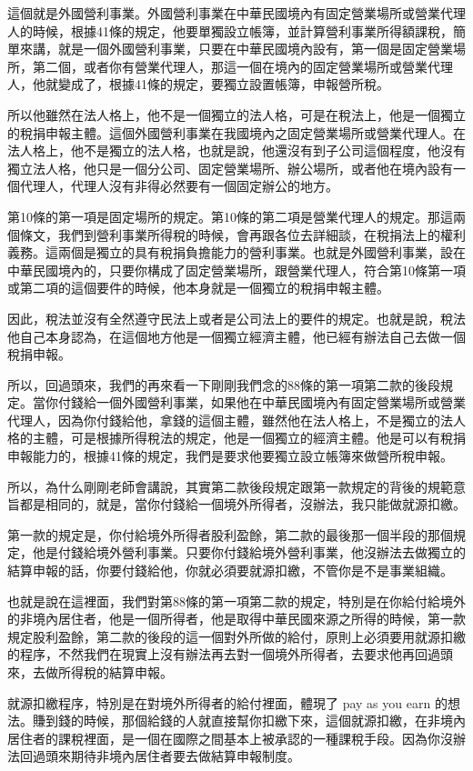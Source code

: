 \documentclass[oneside,sub3section]{ctexbook}
\begin{document}
這個就是外國營利事業。外國營利事業在中華民國境內有固定營業場所或營業代理人的時候，根據41條的規定，他要單獨設立帳簿，並計算營利事業所得額課稅，簡單來講，就是一個外國營利事業，只要在中華民國境內設有，第一個是固定營業場所，第二個，或者你有營業代理人，那這一個在境內的固定營業場所或營業代理人，他就變成了，根據41條的規定，要獨立設置帳簿，申報營所稅。

所以他雖然在法人格上，他不是一個獨立的法人格，可是在稅法上，他是一個獨立的稅捐申報主體。這個外國營利事業在我國境內之固定營業場所或營業代理人。在法人格上，他不是獨立的法人格，也就是說，他還沒有到子公司這個程度，他沒有獨立法人格，他只是一個分公司、固定營業場所、辦公場所，或者他在境內設有一個代理人，代理人沒有非得必然要有一個固定辦公的地方。

第10條的第一項是固定場所的規定。第10條的第二項是營業代理人的規定。那這兩個條文，我們到營利事業所得稅的時候，會再跟各位去詳細談，在稅捐法上的權利義務。這兩個是獨立的具有稅捐負擔能力的營利事業。也就是外國營利事業，設在中華民國境內的，只要你構成了固定營業場所，跟營業代理人，符合第10條第一項或第二項的這個要件的時候，他本身就是一個獨立的稅捐申報主體。

因此，稅法並沒有全然遵守民法上或者是公司法上的要件的規定。也就是說，稅法他自己本身認為，在這個地方他是一個獨立經濟主體，他已經有辦法自己去做一個稅捐申報。

所以，回過頭來，我們的再來看一下剛剛我們念的88條的第一項第二款的後段規定。當你付錢給一個外國營利事業，如果他在中華民國境內有固定營業場所或營業代理人，因為你付錢給他，拿錢的這個主體，雖然他在法人格上，不是獨立的法人格的主體，可是根據所得稅法的規定，他是一個獨立的經濟主體。他是可以有稅捐申報能力的，根據41條的規定，我們是要求他要獨立設立帳簿來做營所稅申報。

所以，為什么剛剛老師會講說，其實第二款後段規定跟第一款規定的背後的規範意旨都是相同的，就是，當你付錢給一個境外所得者，沒辦法，我只能做就源扣繳。

第一款的規定是，你付給境外所得者股利盈餘，第二款的最後那一個半段的那個規定，他是付錢給境外營利事業。只要你付錢給境外營利事業，他沒辦法去做獨立的結算申報的話，你要付錢給他，你就必須要就源扣繳，不管你是不是事業組織。

也就是說在這裡面，我們對第88條的第一項第二款的規定，特別是在你給付給境外的非境內居住者，他是一個所得者，他是取得中華民國來源之所得的時候，第一款規定股利盈餘，第二款的後段的這一個對外所做的給付，原則上必須要用就源扣繳的程序，不然我們在現實上沒有辦法再去對一個境外所得者，去要求他再回過頭來，去做所得稅的結算申報。

就源扣繳程序，特別是在對境外所得者的給付裡面，體現了 pay as you earn 的想法。賺到錢的時候，那個給錢的人就直接幫你扣繳下來，這個就源扣繳，在非境內居住者的課稅裡面，是一個在國際之間基本上被承認的一種課稅手段。因為你沒辦法回過頭來期待非境內居住者要去做結算申報制度。
\end{document}
